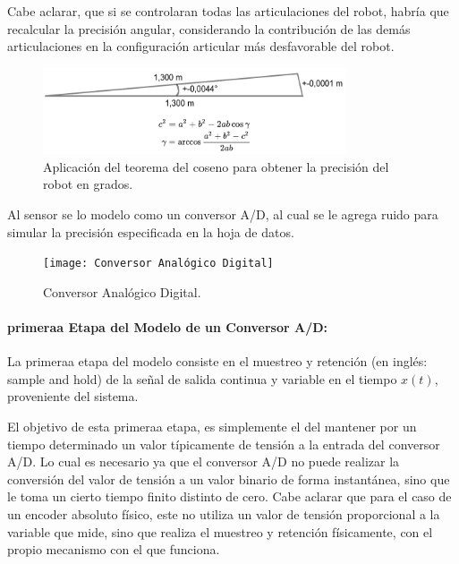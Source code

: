 \documentclass{article}
\begin{document}
\begin{sloppypar}
Cabe aclarar, que si se controlaran todas las articulaciones del robot, habría que recalcular la precisión angular, considerando la contribución de las demás articulaciones en la configuración articular más desfavorable del robot.

\begin{figure}[H]
    \centering
    \includegraphics[width=0.8\textwidth]{Aplicación del teorema del coseno para obtener la precisión del robot en grados}
    \caption{Aplicación del teorema del coseno para obtener la precisión del robot en grados.}
    \label{fig:Aplicación del teorema del coseno para obtener la precisión del robot en grados}
\end{figure}

Al sensor se lo modelo como un conversor A/D, al cual se le agrega ruido para simular la precisión especificada en la hoja de datos.

\begin{figure}[H]
    \centering
    \texttt{[image: Conversor Analógico Digital]}
    \caption{Conversor Analógico Digital.}
    \label{fig:Conversor Analógico Digital}
\end{figure}

\paragraph{primeraa Etapa del Modelo de un Conversor A/D:}
\label{sec:primeraa Etapa del Modelo de un Conversor A/D:}
\hfill

\hfill

La primeraa etapa del modelo consiste en el muestreo y retención (en inglés: sample and hold) de la señal de salida continua y variable en el tiempo $x(t)$, proveniente del sistema.

El objetivo de esta primeraa etapa, es simplemente el del mantener por un tiempo determinado un valor típicamente de tensión a la entrada del conversor A/D. Lo cual es necesario ya que el conversor A/D no puede realizar la conversión del valor de tensión a un valor binario de forma instantánea, sino que le toma un cierto tiempo finito distinto de cero. Cabe aclarar que para el caso de un encoder absoluto físico, este no utiliza un valor de tensión proporcional a la variable que mide, sino que realiza el muestreo y retención físicamente, con el propio mecanismo con el que funciona.


\end{sloppypar}
\end{document}
